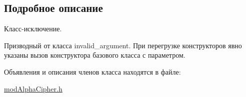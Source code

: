 \subsection{Подробное описание}
Класс-\/исключение. 

Призводный от класса invalid\+\_\+argument. При перегрузке конструкторов явно указаны вызов конструктора базового класса с параметром. 

Объявления и описания членов класса находятся в файле\+:\begin{DoxyCompactItemize}
\item 
\hyperlink{modAlphaCipher_8h}{mod\+Alpha\+Cipher.\+h}\end{DoxyCompactItemize}

